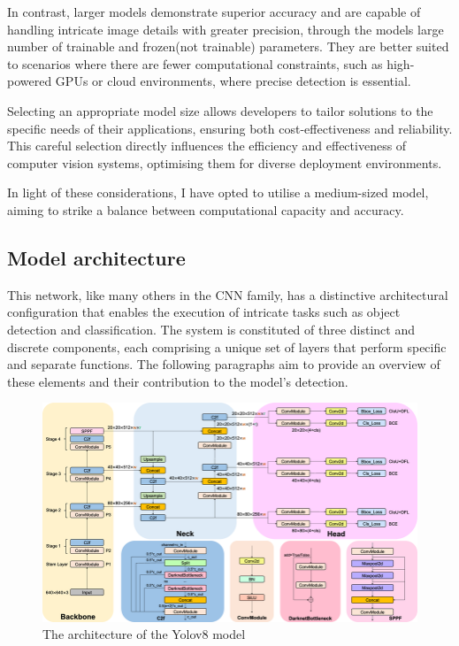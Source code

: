 In contrast, larger models demonstrate superior accuracy and are capable of handling intricate image details with greater precision, through the models large number of trainable and frozen(not trainable) parameters.
They are better suited to scenarios where there are fewer computational constraints, such as high-powered GPUs or cloud environments, where precise detection is essential.

Selecting an appropriate model size allows developers to tailor solutions to the specific needs of their applications, ensuring both cost-effectiveness and reliability.
This careful selection directly influences the efficiency and effectiveness of computer vision systems, optimising them for diverse deployment environments.

In light of these considerations, I have opted to utilise a medium-sized model, aiming to strike a balance between computational capacity and accuracy.
\newpage
\subsection{Model architecture}\label{subsec:architecture}
This network, like many others in the CNN family, has a distinctive architectural configuration that
enables the execution of intricate tasks such as object detection and classification.
The system is constituted of three distinct and discrete components,
each comprising a unique set of layers that perform specific and separate functions.
The following paragraphs aim to provide an overview of these elements and their contribution to the model's detection.

\begin{figure}[ht]
\includegraphics[width=1.0\textwidth]{figures/Detailed-illustration-of-YOLOv8-model-architecture-The-Backbone-Neck-and-Head-are-the}
\caption{The architecture of the Yolov8 model~\cite{FractureDetection2024}}
\label{fig:architecture}
\end{figure}

